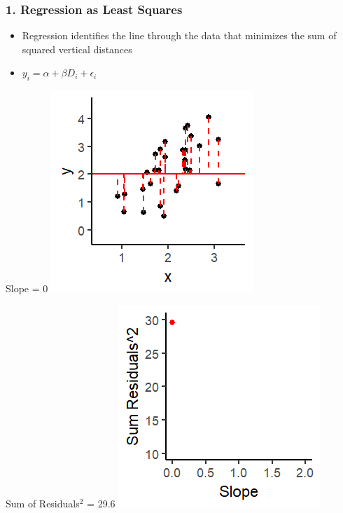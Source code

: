 \documentclass[xcolor=x11names,compress]{beamer}\usepackage[]{graphicx}\usepackage[]{color}
\makeatletter
\def\maxwidth{ %
  \ifdim\Gin@nat@width>\linewidth
    \linewidth
  \else
    \Gin@nat@width
  \fi
}
\newenvironment{knitrout}{}{} %
\renewcommand{\(}{\begin{columns}}
\renewcommand{\)}{\end{columns}}
\newcommand{\<}[1]{\begin{column}{#1}}
\renewcommand{\>}{\end{column}}
\makeatother
\begin{document}
\begin{frame}
\frametitle{1. Regression as Least Squares}
\begin{itemize}
\item Regression identifies the line through the data that minimizes the sum of squared vertical distances 
\item $y_i = \alpha + \beta D_i + \epsilon_i$
\end{itemize}
\begin{multicols}{2}
Slope = 0
\begin{knitrout}
\color{fgcolor}
\includegraphics[width=\maxwidth]{figure/graph_ols1-1} 

\end{knitrout}
\columnbreak
\pause
Sum of Residuals$^2$ = 29.6
\begin{knitrout}
\color{fgcolor}
\includegraphics[width=\maxwidth]{figure/graph_ssr1-1} 

\end{knitrout}
\end{multicols}
\end{frame}
\end{document}
